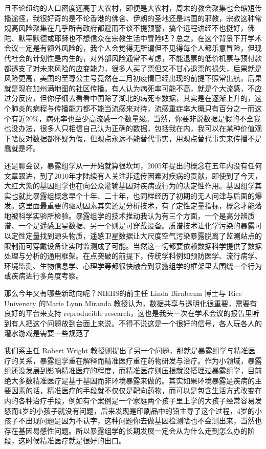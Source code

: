 \documentclass[
]{book}
\begin{document}
且不论纽约的人口密度远高于大农村，即便是大农村，周末的教会聚集也会缩短传播途径，我很好奇的是不论香港的佛舍、伊朗的圣地还是韩国的邪教，宗教这种常规高风险聚集在几乎所有政府都避而不谈不提预警，搞个远程讲经不也挺好，佛陀、默罕默德或耶稣也不想信众在宗教生活中冒险吧？总之，在这个背景下开学术会议一定是有额外风险的，我个人会觉得无所谓但不见得每个人都乐意冒险，但现代社会的计划性是内生的，对外部风险通常不考虑，不能退票的低价机票与预付款都透支了对未来风险的应变能力，很多人买了票但又不甘心退票的损失，后果就是风险更高，美国的至尊公主号竟然在二月初疫情已经出现的前提下照常出航，后果就是现在加州满地图的社区传播。有人认为病死率可能不高，就是个大流感，不应过分反应，但你仔细去看看中国除了湖北的病死率数据，其实是在逐渐上升的，这个肺炎的病程与传播能力都不能当流感来对待，流感重症率大概只有百分之一而这个有近20\%，病死率也至少高流感一个数量级。当然，你要非说数据是假的不全我也没办法，很多人只相信自己认为正确的数据，包括我在内，我可以在某种价值观下啥反对数据都怀疑为假，但观点永远不能替代事实，用观点替代事实来传播不是蠢就是坏。

还是聊会议，暴露组学从一开始就算很坎坷，2005年提出的概念在五年内没有任何文章跟进，到了2010年才陆续有人关注非遗传因素对疾病的贡献，即使到了今天，大红大紫的基因组学也在向公众灌输基因对疾病或行为的决定性作用。基因组学其实也就比暴露组概念早个十年、二十年，也同样经历了初期的无人问津与后面的爆发。这里面最重要的驱动因素其实还是分析技术，有了定性定量指标，概念才能落地被科学实验所检验。暴露组学的技术推动我认为有三个方面，一个是高分辨质谱、一个是遥感卫星数据、另一个则是可穿戴设备。质谱技术让化学污染的暴露可以定性定量找到源头物质，遥感卫星数据让大尺度空气污染暴露脱离了监测站点的限制而可穿戴设备让实时监测成了可能。当然这一切都要依赖数据科学提供了数据处理与分析的通用框架。在点突破的前提下，传统学科例如预防医学、流行病学、环境监测、生物信息学、心理学等都很快融合到暴露组学的框架里去围绕一个行为或疾病进行多角度考察。

那么今年又有哪些新动向呢？NIEHS的前主任 Linda Birnbaum 博士与 Rice University 的Marie Lynn Miranda 教授认为，数据共享与透明化很重要，需要有良好的平台来支持 reproducible research，这也是我头一次在学术会议的报告里听到有人把这个问题放到台面上来说。不得不说这是一个很好的信号，各人玩各人的灌水游戏是需要一些规范了

我们系主任 Robert Wright 教授则提出了另一个问题，那就是暴露组学与精准医疗的关系，暴露组学重在解释而精准医疗重在药物研发与治疗。作为小领域，暴露组还没发展到影响精准医疗的程度，而精准医疗则压根就没搭理过暴露组学，目前绝大多数精准医疗是基于基因而非环境暴露来做的。其实如果环境暴露是疾病的主要因素的话，精准医疗的手段就不仅仅是靶向药物，而可以是包含生活方式改变在内的各种治疗手段，例如有个案例是一个家庭两个孩子里上学的大孩子经常容易发怒而4岁的小孩子就没有问题，后来发现是印刷品中的铅主导了这个过程，4岁的小孩子不出现问题是因为不认字，这种问题你去做基因检测啥也不会测出来，当然也存在基因易感性问题。所以暴露组学的长期发展一定会从为什么走到怎么办的阶段，这时候精准医疗就是很好的出口。
\end{document}
